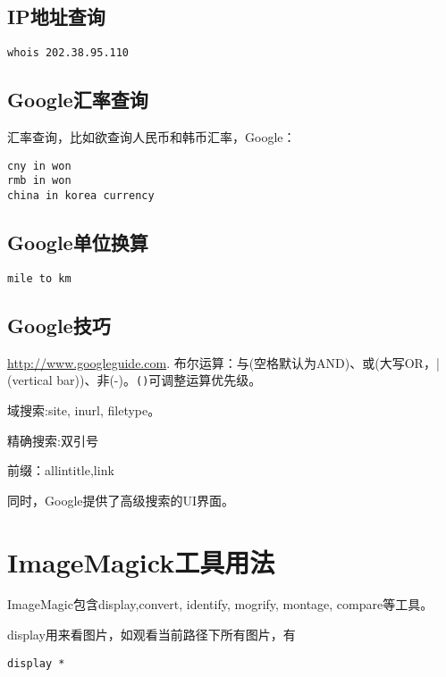 \subsection{IP地址查询}
\begin{verbatim}
whois 202.38.95.110
\end{verbatim}

\subsection{Google汇率查询}
汇率查询，比如欲查询人民币和韩币汇率，Google：
\begin{verbatim}
cny in won
rmb in won
china in korea currency
\end{verbatim}

\subsection{Google单位换算}
\begin{verbatim}
mile to km
\end{verbatim}

\subsection{Google技巧}
\url{http://www.googleguide.com}.
布尔运算：与(空格默认为AND)、或(大写OR，|(vertical bar))、非(-)。\verb+()+可调整运算优先级。

域搜索:site, inurl, filetype。

精确搜索:双引号

前缀：allintitle,link

同时，Google提供了高级搜索的UI界面。

























\section{ImageMagick工具用法}
ImageMagic包含display,convert, identify, mogrify, montage, compare等工具。
\label{sec:imagemagick}

display用来看图片，如观看当前路径下所有图片，有
\begin{verbatim}
display *
\end{verbatim}

